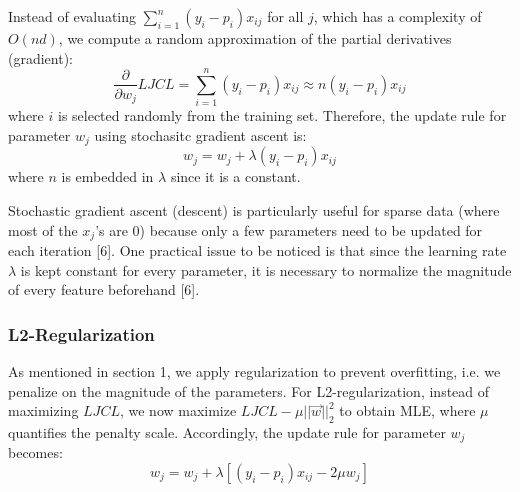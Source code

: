 \documentclass{article} %
\begin{document}
Instead of evaluating $\sum\limits_{i=1}^n(y_i-p_i)x_{ij}$ for all $j$, which has a complexity of
$O(nd)$, we compute a random approximation of the partial derivatives (gradient):
\begin{equation}
  \frac{\partial}{\partial w_j} LJCL = \sum\limits_{i=1}^n(y_i-p_i)x_{ij} \approx n(y_i-p_i)x_{ij}
\end{equation}
where $i$ is selected randomly from the training set. Therefore, the update rule for parameter $w_j$ using stochasitc gradient ascent is:
\begin{equation}
  w_j = w_j + \lambda (y_i-p_i)x_{ij}
\end{equation}
where $n$ is embedded in $\lambda$ since it is a constant.

Stochastic gradient ascent (descent) is particularly useful for sparse data (where most of the $x_j$'s are 0) because only a few parameters need to be updated for each iteration [6]. One practical issue to be noticed is that since the learning rate $\lambda$ is kept constant for every parameter, it is necessary to normalize the magnitude of every feature beforehand [6].

\subsubsection{L2-Regularization}

As mentioned in section 1, we apply regularization to prevent overfitting, i.e. we penalize on the magnitude of the parameters. For L2-regularization, instead of maximizing $LJCL$, we now maximize $LJCL - \mu ||\vec{w}||_2^2$ to obtain MLE, where $\mu$ quantifies the penalty scale. Accordingly, the update rule for parameter $w_j$ becomes:
\begin{equation}
  w_j = w_j + \lambda [(y_i-p_i)x_{ij} - 2\mu w_j]
\end{equation}
\end{document}
